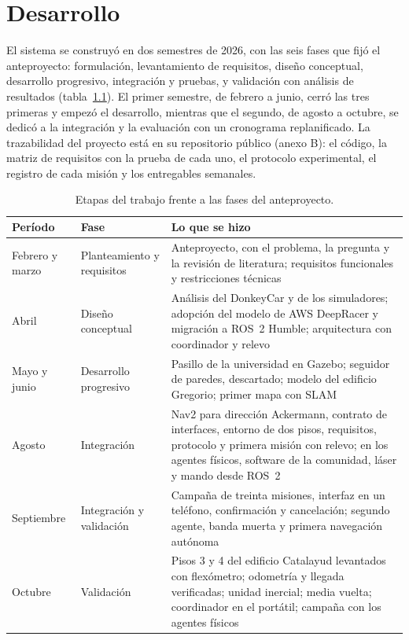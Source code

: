 \chapter{Desarrollo}
\label{cap:desarrollo}

El sistema se construyó en dos semestres de 2026, con las seis fases que fijó el anteproyecto: formulación, levantamiento de requisitos, diseño conceptual, desarrollo progresivo, integración y pruebas, y validación con análisis de resultados (tabla~\ref{tab:etapas}). El primer semestre, de febrero a junio, cerró las tres primeras y empezó el desarrollo, mientras que el segundo, de agosto a octubre, se dedicó a la integración y la evaluación con un cronograma replanificado. La trazabilidad del proyecto está en su repositorio público (anexo B): el código, la matriz de requisitos con la prueba de cada uno, el protocolo experimental, el registro de cada misión y los entregables semanales.

\begin{table}[H]
  \centering
  \caption{Etapas del trabajo frente a las fases del anteproyecto.}
  \label{tab:etapas}
  \footnotesize
  \begin{tabular}{@{}p{}p{}p{}@{}}
    \toprule
    \textbf{Período} & \textbf{Fase} & \textbf{Lo que se hizo} \\ \midrule
    Febrero y marzo & Planteamiento y requisitos & Anteproyecto, con el problema, la pregunta y la revisión de literatura; requisitos funcionales y restricciones técnicas \\ \addlinespace
    Abril & Diseño conceptual & Análisis del DonkeyCar y de los simuladores; adopción del modelo de AWS DeepRacer y migración a ROS~2 Humble; arquitectura con coordinador y relevo \\ \addlinespace
    Mayo y junio & Desarrollo progresivo & Pasillo de la universidad en Gazebo; seguidor de paredes, descartado; modelo del edificio Gregorio; primer mapa con SLAM \\ \addlinespace
    Agosto & Integración & Nav2 para dirección Ackermann, contrato de interfaces, entorno de dos pisos, requisitos, protocolo y primera misión con relevo; en los agentes físicos, software de la comunidad, láser y mando desde ROS~2 \\ \addlinespace
    Septiembre & Integración y validación & Campaña de treinta misiones, interfaz en un teléfono, confirmación y cancelación; segundo agente, banda muerta y primera navegación autónoma \\ \addlinespace
    Octubre & Validación & Pisos 3 y 4 del edificio Catalayud levantados con flexómetro; odometría y llegada verificadas; unidad inercial; media vuelta; coordinador en el portátil; campaña con los agentes físicos \\ \bottomrule
  \end{tabular}
\end{table}

